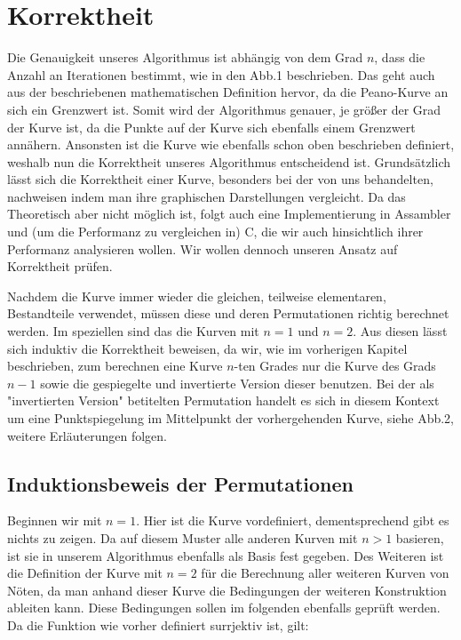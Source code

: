 \documentclass[course=asp]{aspdoc}
\begin{document}
\newpage

\section{Korrektheit} %

Die Genauigkeit unseres Algorithmus ist abhängig von dem Grad $n$, dass die Anzahl an Iterationen bestimmt, wie in den Abb.1 beschrieben. Das geht auch aus der beschriebenen mathematischen Definition hervor, da die Peano-Kurve an sich ein Grenzwert ist. Somit wird der Algorithmus genauer, je größer der Grad der Kurve ist, da die Punkte auf der Kurve sich ebenfalls einem Grenzwert annähern. Ansonsten ist die Kurve wie ebenfalls schon oben beschrieben definiert, weshalb nun die Korrektheit unseres Algorithmus entscheidend ist.
Grundsätzlich lässt sich die Korrektheit einer Kurve, besonders bei der von uns behandelten, nachweisen indem man ihre graphischen Darstellungen vergleicht. Da das Theoretisch aber nicht möglich ist, folgt auch eine Implementierung in Assambler und (um die Performanz zu vergleichen in) C, die wir auch hinsichtlich ihrer Performanz analysieren wollen.
Wir wollen dennoch unseren Ansatz auf Korrektheit prüfen.


Nachdem die Kurve immer wieder die gleichen, teilweise elementaren, Bestandteile verwendet, müssen diese und deren Permutationen richtig berechnet werden. Im speziellen sind das die Kurven mit $n = 1$ und $n = 2$. Aus diesen lässt sich induktiv die Korrektheit beweisen, da wir, wie im vorherigen Kapitel beschrieben, zum berechnen eine Kurve $n$-ten Grades nur die Kurve des Grads $n-1$ sowie die gespiegelte und invertierte Version dieser benutzen. Bei der als "invertierten Version" betitelten Permutation handelt es sich in diesem Kontext um eine Punktspiegelung im Mittelpunkt der vorhergehenden Kurve, siehe Abb.2, weitere Erläuterungen folgen.	%

\subsection{Induktionsbeweis der Permutationen}
Beginnen wir mit $n = 1$. Hier ist die Kurve vordefiniert, dementsprechend gibt es nichts zu zeigen. Da auf diesem Muster alle anderen Kurven mit $n>1$ basieren, ist sie in unserem Algorithmus ebenfalls als Basis fest gegeben.
Des Weiteren ist die Definition der Kurve mit $n = 2$ für die Berechnung aller weiteren Kurven von Nöten, da man anhand dieser Kurve die Bedingungen der weiteren Konstruktion ableiten kann. Diese Bedingungen sollen im folgenden ebenfalls geprüft werden.
Da die Funktion wie vorher definiert surrjektiv ist, gilt:
\end{document}
